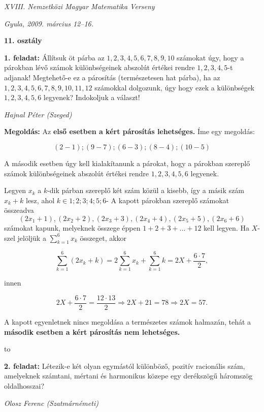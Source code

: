 \documentclass[a4paper,10pt]{article}
\newcommand{\ki}[2]{\hfill {\it #1 (#2)}\medskip}
\newcommand{\vonal}{\hbox to \hsize{\hskip2truecm\hrulefill\hskip2truecm}}
\begin{document}
\begin{center} \Large {\em XVIII. Nemzetközi Magyar Matematika Verseny} \end{center}
\begin{center} \large{\em Gyula, 2009. március 12--16. } \end{center}
\smallskip
\begin{center} \large{\bf 11. osztály} \end{center}
\bigskip 


{\bf 1. feladat:} Állítsuk öt párba az $1, 2, 3, 4, 5, 6, 7, 8, 9, 10$ számokat úgy, hogy a
párokban lévő számok különbségeinek abszolút értékei rendre $1, 2, 3, 4, 5$-t adjanak!
Megtehető-e ez a párosítás (természetesen hat párba), ha az $1, 2, 3, 4, 5, 6, 7, 8, 9, 10, 11, 12$
számokkal dolgozunk, úgy hogy ezek a különbségek $1, 2, 3, 4, 5, 6$ legyenek? Indokoljuk a
választ!

\ki{Hajnal Péter }{Szeged}\medskip

{\bf Megoldás:} Az {\bf első esetben a kért párosítás lehetséges.} Íme egy megoldás:

$$(2-1);(9-7);(6-3);(8-4);(10-5)$$

A második esetben úgy kell kialakítanunk a párokat, hogy a párokban szereplő számok különbségeinek abszolút értékei rendre $1, 2, 3, 4, 5, 6$ legyenek.

Legyen $x_k$ a $k$-dik párban szereplő két szám közül a kisebb, így a másik szám $x_k+k$ lesz, ahol $k\in {1; 2; 3; 4; 5; 6}$- A kapott párokban szereplő számokat összeadva 
$$(2x_1+1), (2x_2+2), (2x_3+3), (2x_4+4), (2x_5+5), (2x_6+6)$$ 
számokat kapunk, melyeknek összege éppen $1+2+3+...+12$ kell legyen. Ha $X$-szel jelöljük a $\sum\limits_{k=1}^{6} x_k$ összeget, akkor

$$\sum_{k=1}^6 (2x_k+k)=2\sum_{k=1}^6 x_k+\sum_{k=1}^6 k=2X+\frac{6\cdot 7}{2},$$

innen

$$2X+\frac{6\cdot 7}{2}=\frac{12\cdot 13}{2} \Rightarrow 2X+21=78 \Rightarrow 2X=57.$$

A kapott egyenletnek nincs megoldása a természetes számok halmazán, tehát a {\bf második esetben a kért párosítás nem lehetséges.}

\medskip
\vonal

{\bf 2. feladat:} Létezik-e két olyan egymástól különböző, pozitív racionális szám,
amelyeknek számtani, mértani és harmonikus közepe egy derékszögű háromszög
oldalhosszai?

\ki{Olosz Ferenc }{Szatmárnémeti}\medskip
\end{document}
